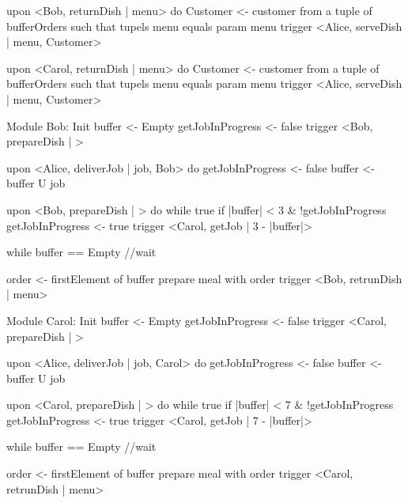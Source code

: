 \documentclass{article}
\begin{document}
upon <Bob, returnDish | menu> do
  Customer <- customer from a tuple of bufferOrders such that tupels menu equals param menu
  trigger <Alice, serveDish | menu, Customer>

upon <Carol, returnDish | menu> do
  Customer <- customer from a tuple of bufferOrders such that tupels menu equals param menu
  trigger <Alice, serveDish | menu, Customer>



Module Bob:
Init
  buffer <- Empty
  getJobInProgress <- false
  trigger <Bob, prepareDish | >

upon <Alice, deliverJob | job, Bob> do
  getJobInProgress <- false
  buffer <- buffer U job

upon <Bob, prepareDish | > do
  while true
    if |buffer| < 3 \& !getJobInProgress
      getJobInProgress <- true
      trigger <Carol, getJob | 3 - |buffer|>

    while buffer == Empty
      //wait

    order <- firstElement of buffer
    prepare meal with order
    trigger <Bob, retrunDish | menu>




Module Carol:
Init
  buffer <- Empty
  getJobInProgress <- false
  trigger <Carol, prepareDish | >


upon <Alice, deliverJob | job, Carol> do
  getJobInProgress <- false
  buffer <- buffer U job

upon <Carol, prepareDish | > do
  while true
    if |buffer| < 7 \& !getJobInProgress
      getJobInProgress <- true
      trigger <Carol, getJob | 7 - |buffer|>

    while buffer == Empty
      //wait

    order <- firstElement of buffer
    prepare meal with order
    trigger <Carol, retrunDish | menu>


	\newpage
\end{document}
